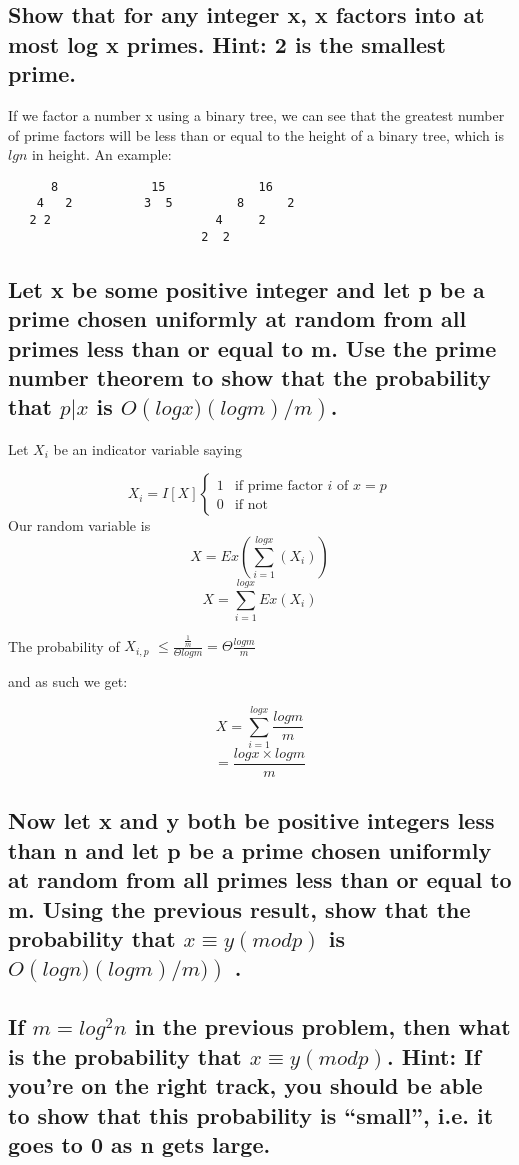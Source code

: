 \documentclass[titlepage]{article}\usepackage[]{graphicx}\usepackage[]{color}
\begin{document}
\subsection{Show that for any integer x, x factors into at most log x primes. Hint: 2 is
the smallest prime.}
If we factor a number x using a binary tree, we can see that the greatest
number of prime factors will be less than or equal to the height of a binary
tree, which is $lg n$ in height. An example:

\begin{verbatim}
      8             15             16
    4   2          3  5         8      2
   2 2                       4     2
                           2  2
\end{verbatim}

\subsection{ Let x be some positive integer and let p be a prime chosen uniformly at
random from all primes less than or equal to m. Use the prime number theorem to
show that the probability that $p|x$ is $O\left( log x)(log m)/m\right)$. }

Let $X_i$ be an indicator variable saying 

\[
	X_i = I[X]
  \begin{cases}
	1 & \text{if prime factor } i \text{ of } x = p \\
	0 & \text{if not } 
  \end{cases}
\]
Our random variable is 
\[ X = Ex\left(\sum_{i=1}^{logx}(X_i) \right) \]
	\[ X = \sum_{i=1}^{logx}Ex(X_i) \]

The probability of $X_{i,p}$ $\leq \frac{\frac{1}{m}}{\Theta log m} = \Theta
\frac{log m}{m} $

and as such we get:

\[ X = \sum_{i=1}^{logx} \frac{log m}{m} \]
\[  = \frac{log x\times log m}{m} \]


\subsection{ Now let x and y both be positive integers less than n and let p be a prime
chosen uniformly at random from all primes less than or equal to m. Using the
previous result, show that the probability that $ x ≡ y (mod p)$  is $ O\left( log
n)(log m)/m)\right)$ . }

\subsection{ If $ m = log^2 n$  in the previous problem, then what is the probability that
$x ≡ y (mod p)$. Hint: If you're on the right track, you should be able to show
that this probability is ``small'', i.e. it goes to 0 as n gets large. }
\end{document}
